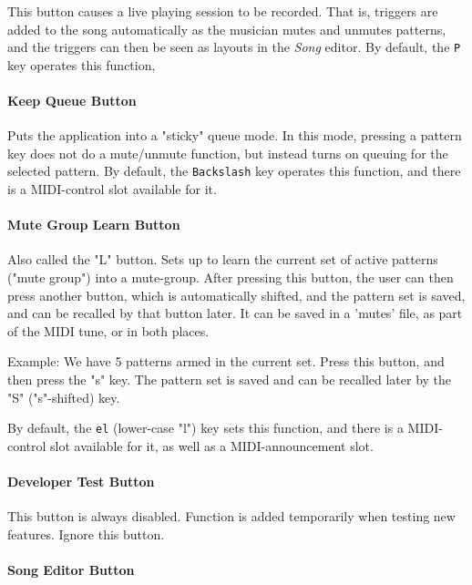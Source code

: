 \documentclass[
 11pt,
 twoside,
 a4paper,
 headinclude,
 footinclude,
 final                                 %
]{article}
\begin{document}
   This button causes a live playing session to be recorded.
   That is, triggers are added to the song automatically as the musician mutes
   and unmutes patterns, and the triggers can then be
   seen as layouts in the \textsl{Song} editor.
   By default, the \texttt{P} key operates this function,

\paragraph{Keep Queue Button}
\label{paragraph:introduction_keep_queue_button}

   Puts the application into a "sticky" queue mode.
   In this mode, pressing a pattern key does not do a mute/unmute function, but
   instead turns on queuing for the selected pattern.
   By default, the \texttt{Backslash} key operates this function,
   and there is a MIDI-control slot available for it.

\paragraph{Mute Group Learn Button}
\label{paragraph:introduction_mute_group_learn_button}

   Also called the "L" button.
   Sets up to learn the current set of active patterns ("mute group") into a
   mute-group.
   After pressing this button, the user can then press another button, which is
   automatically shifted, and the pattern set is saved, and can be recalled by
   that button later.  It can be saved in a 'mutes' file, as part of the MIDI
   tune, or in both places.

   Example:  We have 5 patterns armed in the current set. Press this button,
   and then press the "s" key.  The pattern set is saved and can be recalled
   later by the "S" ("s"-shifted) key.

   By default, the \texttt{el} (lower-case "l") key sets this function,
   and there is a MIDI-control slot available for it, as well as a
   MIDI-announcement slot.

\paragraph{Developer Test Button}
\label{paragraph:introduction_developer_test_button}

   This button is always disabled.  Function is added temporarily when testing
   new features. Ignore this button.

\paragraph{Song Editor Button}
\label{paragraph:introduction_song_editor_button}
\end{document}
